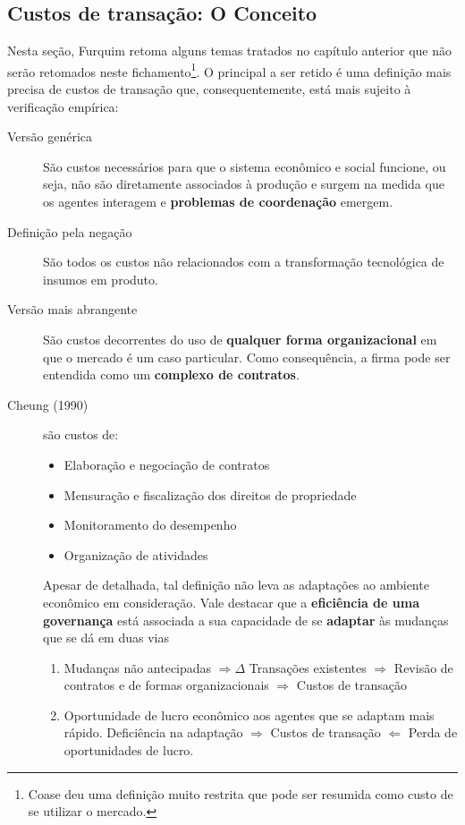 \documentclass[9pt,twocolumn,twoside,lineno]{style}
\begin{document}
\subsection{Custos de transação: O Conceito}

Nesta seção, Furquim retoma alguns temas tratados no capítulo anterior que não serão retomados neste fichamento\footnote{Coase deu uma definição muito restrita que pode ser resumida como custo de se utilizar o mercado.}. O principal a ser retido é uma definição mais precisa de custos de transação que, consequentemente, está mais sujeito à verificação empírica:
\begin{description}
	\item[Versão genérica] São custos necessários para que o sistema econômico e social funcione, ou seja, não são diretamente associados à produção e surgem na medida que os agentes interagem e \textbf{problemas de coordenação} emergem.
	\item[Definição pela negação] São todos os custos não relacionados com a transformação tecnológica de insumos em produto.
	\item[Versão mais abrangente] São custos decorrentes do uso de \textbf{qualquer forma organizacional} em que o mercado é um caso particular. Como consequência, a firma pode ser entendida como um \textbf{complexo de contratos}.
	\item[Cheung (1990)] são custos de:
		\begin{itemize}
			\item Elaboração e negociação de contratos
			\item Mensuração e fiscalização dos direitos de propriedade
			\item Monitoramento do desempenho
			\item Organização de atividades
		\end{itemize}
	Apesar de detalhada, tal definição não leva as adaptações ao ambiente econômico em consideração. Vale destacar que a \textbf{eficiência de uma governança} está associada a sua capacidade de se \textbf{adaptar} às mudanças que se dá em duas vias
		\begin{enumerate}
			\item Mudanças não antecipadas $\Rightarrow \Delta$ Transações existentes $\Rightarrow$ Revisão de contratos e de formas organizacionais $\Rightarrow$ Custos de transação
			\item Oportunidade de lucro econômico aos agentes que se adaptam mais rápido. Deficiência na adaptação $\Rightarrow$ Custos de transação $\Leftarrow$ Perda de oportunidades de lucro.
		\end{enumerate}
\end{description}
\end{document}
